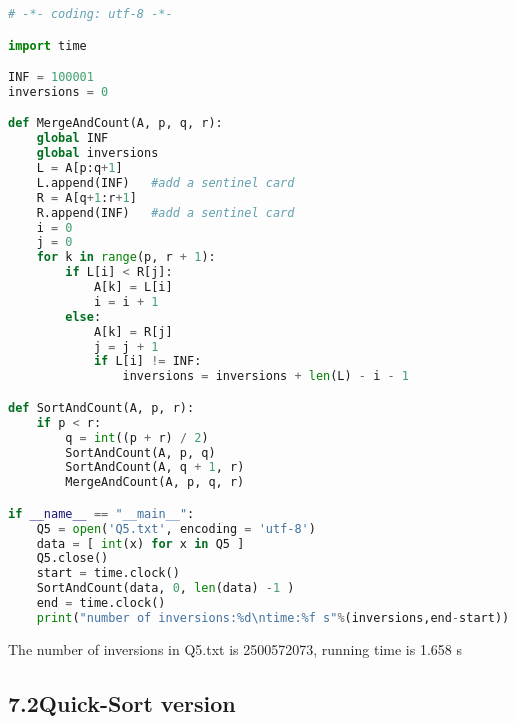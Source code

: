 \documentclass[a4paper,12pt]{article}
\begin{document}
\begin{lstlisting}[language=Python]
# -*- coding: utf-8 -*-

import time

INF = 100001
inversions = 0

def MergeAndCount(A, p, q, r):
    global INF
    global inversions
    L = A[p:q+1]
    L.append(INF)	#add a sentinel card
    R = A[q+1:r+1]
    R.append(INF)	#add a sentinel card
    i = 0
    j = 0
    for k in range(p, r + 1):
        if L[i] < R[j]:
            A[k] = L[i]
            i = i + 1
        else:
            A[k] = R[j]
            j = j + 1
            if L[i] != INF:
                inversions = inversions + len(L) - i - 1

def SortAndCount(A, p, r):
    if p < r:
        q = int((p + r) / 2)
        SortAndCount(A, p, q)
        SortAndCount(A, q + 1, r)
        MergeAndCount(A, p, q, r)

if __name__ == "__main__":
    Q5 = open('Q5.txt', encoding = 'utf-8')
    data = [ int(x) for x in Q5 ]
    Q5.close()
    start = time.clock()
    SortAndCount(data, 0, len(data) -1 )
    end = time.clock()
    print("number of inversions:%d\ntime:%f s"%(inversions,end-start))

\end{lstlisting}

The number of inversions in Q5.txt is 2500572073, running time is 1.658 s

\subsection*{\textnormal{7.2\quad Quick-Sort version}}
\end{document}
